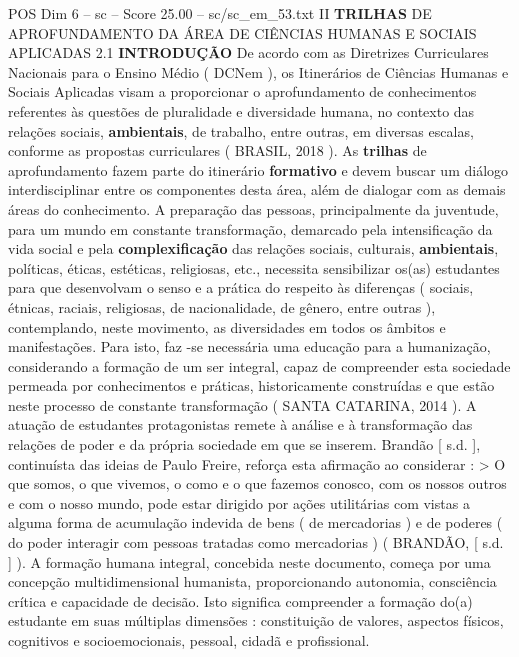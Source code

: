 \begin{textsample}{POS Dim 6 – sc – Score 25.00 – sc/sc\_em\_53.txt}  \label{ex:f6_pos_014}
II \textbf{TRILHAS} DE APROFUNDAMENTO DA ÁREA DE CIÊNCIAS HUMANAS E SOCIAIS APLICADAS 2.1 \textbf{INTRODUÇÃO} De acordo com as Diretrizes Curriculares Nacionais para o Ensino Médio ( DCNem ), os Itinerários de Ciências Humanas e Sociais Aplicadas visam a proporcionar o aprofundamento de conhecimentos referentes às questões de pluralidade e diversidade humana, no contexto das relações sociais, \textbf{ambientais}, de trabalho, entre outras, em diversas escalas, conforme as propostas curriculares ( BRASIL, 2018 ).
As \textbf{trilhas} de aprofundamento fazem parte do itinerário \textbf{formativo} e devem buscar um diálogo interdisciplinar entre os componentes desta área, além de dialogar com as demais áreas do conhecimento.
A preparação das pessoas, principalmente da juventude, para um mundo em constante transformação, demarcado pela intensificação da vida social e pela \textbf{complexificação} das relações sociais, culturais, \textbf{ambientais}, políticas, éticas, estéticas, religiosas, etc., necessita sensibilizar os(as) estudantes para que desenvolvam o senso e a prática do respeito às diferenças ( sociais, étnicas, raciais, religiosas, de nacionalidade, de gênero, entre outras ), contemplando, neste movimento, as diversidades em todos os âmbitos e manifestações.
Para isto, faz -se necessária uma educação para a humanização, considerando a formação de um ser integral, capaz de compreender esta sociedade permeada por conhecimentos e práticas, historicamente construídas e que estão neste processo de constante transformação ( SANTA CATARINA, 2014 ).
A atuação de estudantes protagonistas remete à análise e à transformação das relações de poder e da própria sociedade em que se inserem.
Brandão [ s.d. ], continuísta das ideias de Paulo Freire, reforça esta afirmação ao considerar : > O que somos, o que vivemos, o como e o que fazemos conosco, com os nossos outros e com o nosso mundo, pode estar dirigido por ações utilitárias com vistas a alguma forma de acumulação indevida de bens ( de mercadorias ) e de poderes ( do poder interagir com pessoas tratadas como mercadorias ) ( BRANDÃO, [ s.d. ] ).
A formação humana integral, concebida neste documento, começa por uma concepção multidimensional humanista, proporcionando autonomia, consciência crítica e capacidade de decisão.
Isto significa compreender a formação do(a) estudante em suas múltiplas dimensões : constituição de valores, aspectos físicos, cognitivos e socioemocionais, pessoal, cidadã e profissional.

\end{textsample}
